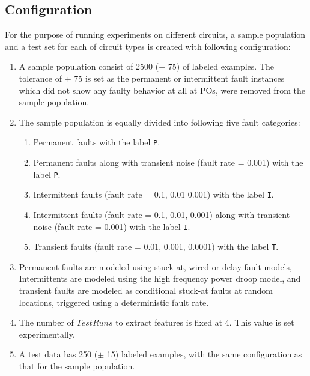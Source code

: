 \subsection{Configuration}
\label{sec:gsp:configuration}
For the purpose of running experiments on different circuits, a sample population and a test set for each of circuit types is created with following configuration:
\begin{enumerate}
  \item A sample population consist of 2500 ($\pm$ 75) of labeled examples. The tolerance of $\pm$ 75 is set as the permanent or intermittent fault instances which did not show any faulty behavior at all at POs, were removed from the sample population.
  \item The sample population is equally divided into following five fault categories:
		\begin{enumerate}
    		\item Permanent faults with the label \texttt{P}.
    		\item Permanent faults along with transient noise (fault rate = 0.001) with the label \texttt{P}.
			\item Intermittent faults (fault rate = 0.1, 0.01 0.001) with the label \texttt{I}.
    		\item Intermittent faults (fault rate = 0.1, 0.01, 0.001) along with transient noise (fault rate = 0.001) with the label \texttt{I}.
			\item Transient faults (fault rate = 0.01, 0.001, 0.0001) with the label \texttt{T}.
 		 \end{enumerate}
	\item Permanent faults are modeled using stuck-at, wired or delay fault models, Intermittents are modeled using the high frequency power droop model, and transient faults are modeled as conditional stuck-at faults at random locations, triggered using a deterministic fault rate.
		\item The number of $TestRuns$ to extract features is fixed at 4. This value is set experimentally. 
  \item A test data has 250 ($\pm$ 15) labeled examples, with the same configuration as that for the sample population.
\end{enumerate}

